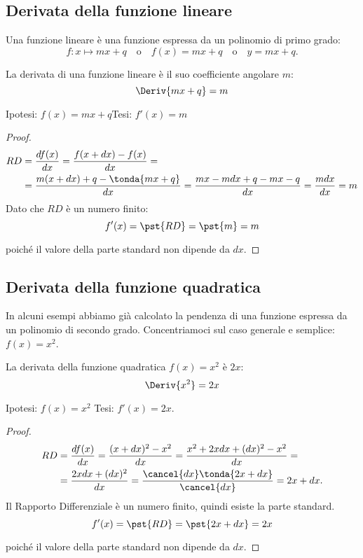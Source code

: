 \subsection{Derivata della funzione lineare}
\label{subsec:differenziazione_derivataflineare}
Una funzione lineare è una funzione espressa da un polinomio di primo grado:
\[f: x \mapsto mx +q \quad \text{o} \quad   f(x)=mx +q \quad \text{o} \quad 
  y = mx +q.\]
\begin{teorema}
La derivata di una funzione lineare è il suo coefficiente angolare \(m\):
\[\Deriv{mx+q}=m\]
\end{teorema}
\noindent Ipotesi: \(f(x)=mx+q\)\tab Tesi: \(f'(x)=m\)
\begin{proof}
\begin{align*}
RD &=\dfrac{df(x)}{dx} =\dfrac{f(x+dx)-f(x)}{dx}=\\
               &=\dfrac{m(x+dx)+q-\tonda{mx+q}}{dx}=
                 \dfrac{mx-mdx+q-mx-q}{dx}=
                 \dfrac{mdx}{dx}=m
\end{align*}
Dato che \(RD\) è un numero finito:
\[f'(x) = \pst{RD}= \pst{m}=m\]

\vspace{-1em} \hspace{20mm} 
poiché il valore della parte standard non dipende da \(dx\).
\end{proof}

\subsection{Derivata della funzione quadratica}
\label{subsec:differenziazione_derivatafquadratica}
In alcuni esempi abbiamo già calcolato la pendenza di una funzione 
espressa da un polinomio di secondo grado. 
Concentriamoci sul caso generale e semplice: 
\(f(x)=x^2\).
\begin{teorema}
La derivata della funzione quadratica \(f(x)=x^2\) è \(2x\):
\[\Deriv{x^2}=2x\] 
\end{teorema}
\noindent Ipotesi: \(f(x)=x^2\) \tab Tesi: \(f'(x)=2x\).
\begin{proof}
\begin{align*}
RD &=\dfrac{df(x)}{dx}=\dfrac{(x+dx)^2-x^2}{dx}=
     \dfrac{x^2+2xdx+(dx)^2-x^2}{dx}=\\
   &=\dfrac{2xdx+(dx)^2}{dx}=
     \dfrac{\cancel{dx}\tonda{2x+dx}}{\cancel{dx}} = 2x+dx.
\end{align*}
Il Rapporto Differenziale è un numero finito, quindi esiste la parte 
standard.
\[f'(x) = \pst{RD}=\pst{2x+dx}=2x\]

\vspace{-1em} \hspace{20mm} 
poiché il valore della parte standard non dipende da \(dx\).
\end{proof}

